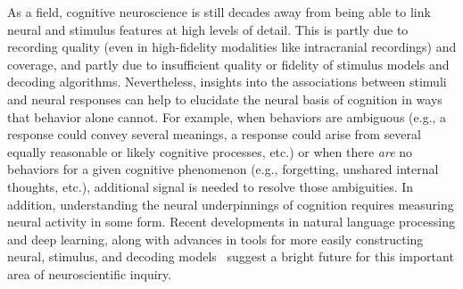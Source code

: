 \documentclass{llmxive}
\begin{document}
As a field, cognitive neuroscience is still decades away from being
able to link neural and stimulus features at high levels of detail.
This is partly due to recording quality (even in high-fidelity
modalities like intracranial recordings) and coverage, and partly due
to insufficient quality or fidelity of stimulus models and decoding
algorithms.  Nevertheless, insights into the associations between
stimuli and neural responses can help to elucidate the neural basis of
cognition in ways that behavior alone cannot.  For example, when
behaviors are ambiguous (e.g., a response could convey several
meanings, a response could arise from several equally reasonable or
likely cognitive processes, etc.) or when there \textit{are} no
behaviors for a given cognitive phenomenon (e.g., forgetting, unshared
internal thoughts, etc.), additional signal is needed to resolve those
ambiguities.  In addition, understanding the neural underpinnings of
cognition requires measuring neural activity in some form.
Recent developments in natural language processing and deep learning,
along with advances in tools for more easily constructing neural,
stimulus, and decoding models~\citep[e.g.,][]{GelmEtal15, AbadEtal16,
  PaszEtal19} suggest a bright future for this important area of
neuroscientific inquiry.
\end{document}
